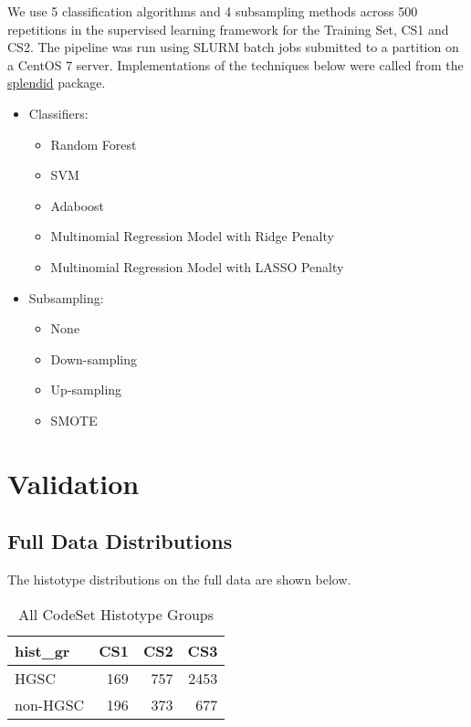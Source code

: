 \documentclass[
]{report}
\providecommand{\tightlist}{%
  \setlength{\itemsep}{0pt}\setlength{\parskip}{0pt}}
\begin{document}
We use 5 classification algorithms and 4 subsampling methods across 500 repetitions in the supervised learning framework for the Training Set, CS1 and CS2. The pipeline was run using SLURM batch jobs submitted to a partition on a CentOS 7 server. Implementations of the techniques below were called from the \href{https://alinetalhouk.github.io/splendid/}{splendid} package.

\begin{itemize}
\item
  Classifiers:

  \begin{itemize}
  \tightlist
  \item
    Random Forest
  \item
    SVM
  \item
    Adaboost
  \item
    Multinomial Regression Model with Ridge Penalty
  \item
    Multinomial Regression Model with LASSO Penalty
  \end{itemize}
\item
  Subsampling:

  \begin{itemize}
  \tightlist
  \item
    None
  \item
    Down-sampling
  \item
    Up-sampling
  \item
    SMOTE
  \end{itemize}
\end{itemize}

\hypertarget{validation}{%
\chapter{Validation}\label{validation}}

\hypertarget{full-data-distributions}{%
\section{Full Data Distributions}\label{full-data-distributions}}

The histotype distributions on the full data are shown below.

\begin{table}

\caption{\label{tab:dist-all-gr}All CodeSet Histotype Groups}
\centering
\begin{tabular}[t]{l|r|r|r}
\hline
hist\_gr & CS1 & CS2 & CS3\\
\hline
HGSC & 169 & 757 & 2453\\
\hline
non-HGSC & 196 & 373 & 677\\
\hline
\end{tabular}
\end{table}
\end{document}
